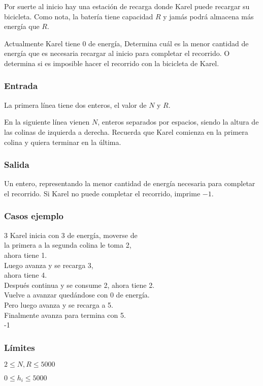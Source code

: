 Por suerte al inicio hay una estación de recarga donde Karel puede recargar su bicicleta. Como nota, la batería tiene capacidad \(R\) y jamás podrá almacena más energía que \(R\).

Actualmente Karel tiene \(0\) de energía, Determina cuál es la menor cantidad de energía que es necesaria recargar al inicio para completar el recorrido. O determina si es imposible hacer el recorrido con la bicicleta de Karel.

\subsubsection*{Entrada}
La primera línea tiene dos enteros, el valor de \(N\) y \(R\).

En la siguiente línea vienen \(N\), enteros separados por espacios, siendo la altura de las colinas de izquierda a derecha. Recuerda que Karel comienza en la primera colina y quiera terminar en la última.
\subsubsection*{Salida}
Un entero, representando la menor cantidad de energía necesaria para completar el recorrido. Si Karel no puede completar el recorrido, imprime \(-1\).

\subsubsection*{Casos ejemplo}
\begin{casebox3}	
	{3}
	{
		Karel inicia con 3 de energía, moverse de   \\
		la primera a la segunda colina le toma 2,  \\
		ahora tiene 1.\\
		Luego avanza y se recarga 3,\\
		ahora tiene 4.\\
		Después continua y se consume 2, ahora tiene 2. \\
		Vuelve a avanzar quedándose con 0 de energía. \\		
		Pero luego avanza y se recarga a 5. \\
		Finalmente avanza para termina con 5. \\
	}
	{-1}
	{}
	\hline
\end{casebox3}	

\subsubsection*{Límites}
\begin{plimits}
	\item \(2\leq N, R \leq 5000\)
	\item \(0\leq h_i\leq 5000\)
\end{plimits}

